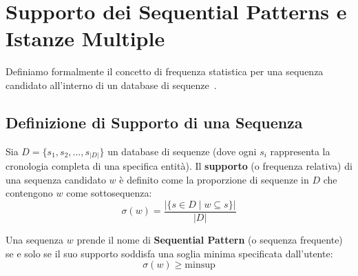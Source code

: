 \section{Supporto dei Sequential Patterns e Istanze Multiple}
\label{sec:dm-seq-patterns-instances}

Definiamo formalmente il concetto di frequenza statistica per una sequenza candidato all'interno di un database di sequenze~\cite{tan2018, agrawal1995}.

\FloatBarrier
\subsection{Definizione di Supporto di una Sequenza}
\begin{definition}
Sia $D = \{s_1, s_2, \dots, s_{|D|}\}$ un database di sequenze (dove ogni $s_i$ rappresenta la cronologia completa di una specifica entità). Il \textbf{supporto} (o frequenza relativa) di una sequenza candidato $w$ è definito come la proporzione di sequenze in $D$ che contengono $w$ come sottosequenza:
\begin{equation}
\label{eq:seq-support-definition}
\sigma(w) = \frac{\big| \{ s \in D \mid w \subseteq s \} \big|}{|D|}
\end{equation}
\end{definition}

\begin{definition}
Una sequenza $w$ prende il nome di \textbf{Sequential Pattern} (o sequenza frequente) se e solo se il suo supporto soddisfa una soglia minima specificata dall'utente:
\begin{equation}
\sigma(w) \ge \text{minsup}
\end{equation}
\end{definition}

